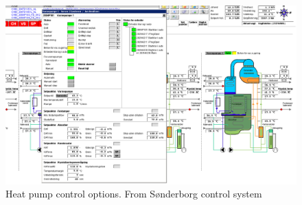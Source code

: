 \vspace{-1.3cm}
\begin{figure}[H]
	\centering
		\includegraphics[width=1.22\textwidth, angle = 270]{appendices/pictures/flow_setpunkter}
		\caption{Heat pump control options. From S\o nderborg  control system}
	\label{fig:setpunkter}
\end{figure}